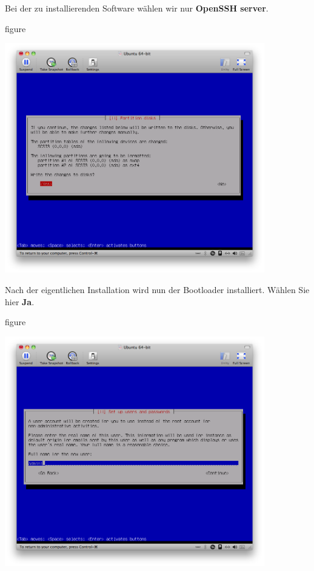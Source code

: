 \pagebreak
Bei der zu installierenden Software wählen wir nur \textbf{OpenSSH server}.

\begin{nofloat}{figure}
\begin{center}
\includegraphics[width=0.85\textwidth]{screenshots/27_ubuntu_install.png}
\end{center}
\end{nofloat}

Nach der eigentlichen Installation wird nun der Bootloader installiert. Wählen Sie hier \textbf{Ja}.

\begin{nofloat}{figure}
\begin{center}
\includegraphics[width=0.85\textwidth]{screenshots/28_ubuntu_install.png}
\end{center}
\end{nofloat}


